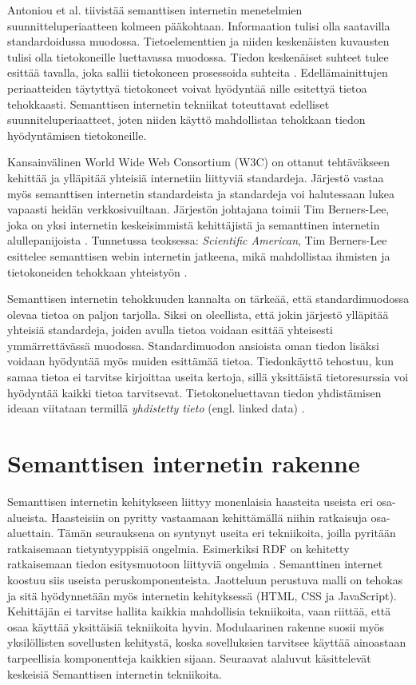 \documentclass[finnish, 12pt, a4paper, elec, utf8, pdfa, online]{aaltothesis}
\begin{document}
Antoniou et al. tiivistää semanttisen internetin menetelmien suunnitteluperiaatteen kolmeen pääkohtaan. Informaation tulisi olla saatavilla standardoidussa muodossa. Tietoelementtien ja niiden keskenäisten kuvausten tulisi olla tietokoneille luettavassa muodossa. Tiedon keskenäiset suhteet tulee esittää tavalla, joka sallii tietokoneen prosessoida suhteita \cite{Antoniou}. Edellämainittujen periaatteiden täytyttyä tietokoneet voivat hyödyntää nille esitettyä tietoa tehokkaasti. Semanttisen internetin tekniikat toteuttavat edelliset suunniteluperiaatteet, joten niiden käyttö mahdollistaa tehokkaan tiedon hyödyntämisen tietokoneille.

Kansainvälinen World Wide Web Consortium (W3C) on ottanut tehtäväkseen kehittää ja ylläpitää yhteisiä internetiin liittyviä standardeja. Järjestö vastaa myös semanttisen internetin standardeista ja standardeja voi halutessaan lukea vapaasti heidän verkkosivuiltaan. Järjestön johtajana toimii Tim Berners-Lee, joka on yksi internetin keskeisimmistä kehittäjistä ja semanttinen internetin alullepanijoista \cite{W3C}. Tunnetussa teoksessa: \textit{Scientific American}, Tim Berners-Lee esittelee semanttisen webin internetin jatkeena, mikä mahdollistaa ihmisten ja tietokoneiden tehokkaan yhteistyön \cite{Berners_visio}.

Semanttisen internetin tehokkuuden kannalta on tärkeää, että standardimuodossa olevaa tietoa on paljon tarjolla. Siksi on oleellista, että jokin järjestö ylläpitää yhteisiä standardeja, joiden avulla tietoa voidaan esittää yhteisesti ymmärrettävässä muodossa. Standardimuodon ansioista oman tiedon lisäksi voidaan hyödyntää myös muiden esittämää tietoa. Tiedonkäyttö tehostuu, kun samaa tietoa ei tarvitse kirjoittaa useita kertoja, sillä yksittäistä tietoresurssia voi hyödyntää kaikki tietoa tarvitsevat. Tietokoneluettavan tiedon yhdistämisen ideaan viitataan termillä \textit{yhdistetty tieto} (engl. linked data) \cite{linked_w3c} \cite{linked_data_finlad}.

\clearpage
\section{Semanttisen internetin rakenne}
Semanttisen internetin kehitykseen liittyy monenlaisia haasteita useista eri osa-alueista. Haasteisiin on pyritty vastaamaan kehittämällä niihin ratkaisuja osa-aluettain. Tämän seurauksena on syntynyt useita eri tekniikoita, joilla pyritään ratkaisemaan tietyntyyppisiä ongelmia. Esimerkiksi RDF on kehitetty ratkaisemaan tiedon esitysmuotoon liittyviä ongelmia \cite{RDF_specification}. Semanttinen internet koostuu siis useista peruskomponenteista. Jaotteluun perustuva malli on tehokas ja sitä hyödynnetään myös internetin kehityksessä (HTML, CSS ja JavaScript). Kehittäjän ei tarvitse hallita kaikkia mahdollisia tekniikoita, vaan riittää, että osaa käyttää yksittäisiä tekniikoita hyvin. Modulaarinen rakenne suosii myös yksilöllisten sovellusten kehitystä, koska sovelluksien tarvitsee käyttää ainoastaan tarpeellisia komponentteja kaikkien sijaan. Seuraavat alaluvut käsittelevät keskeisiä Semanttisen internetin tekniikoita.
\end{document}
